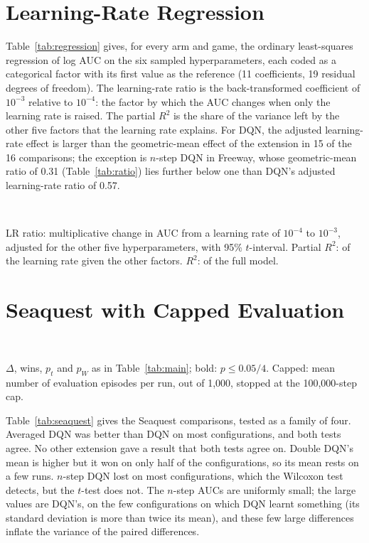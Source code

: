 \documentclass[conference,a4paper]{IEEEtran}
\newcommand{\results}{../analysis_output/corrected-rct-01/report}
\newcommand{\fresults}{../analysis_output/followup-02/report}
\begin{document}
\section{Learning-Rate Regression}\label{app:regression}
Table~\ref{tab:regression} gives, for every arm and game, the ordinary least-squares regression of log AUC on the six
sampled hyperparameters, each coded as a categorical factor with its first value as the reference (11 coefficients,
19 residual degrees of freedom). The learning-rate ratio is the back-transformed coefficient of $10^{-3}$ relative to
$10^{-4}$: the factor by which the AUC changes when only the learning rate is raised. The partial $R^2$ is the share of
the variance left by the other five factors that the learning rate explains. For DQN, the adjusted learning-rate effect
is larger than the geometric-mean effect of the extension in 15 of the 16 comparisons; the exception is $n$-step DQN in
Freeway, whose geometric-mean ratio of 0.31 (Table~\ref{tab:ratio}) lies further below one than DQN's adjusted
learning-rate ratio of 0.57.

\begin{table}[h]
\caption{Adjusted Learning-Rate Effect on Log AUC}
\label{tab:regression}
\centering
\footnotesize
\\[3pt]
\parbox{\columnwidth}{\scriptsize LR ratio: multiplicative change in AUC from a learning rate of $10^{-4}$ to
$10^{-3}$, adjusted for the other five hyperparameters, with 95\% $t$-interval. Partial $R^2$: of the learning rate
given the other factors. $R^2$: of the full model.}
\end{table}

\section{Seaquest with Capped Evaluation}\label{app:seaquest}

\begin{table}[h]
\caption{Seaquest with Capped Evaluation (AUC, $10^{6}$, $n=30$ per Arm)}
\label{tab:seaquest}
\centering
\footnotesize
\setlength{\tabcolsep}{2.5pt}
\\[3pt]
\parbox{\columnwidth}{\scriptsize $\Delta$, wins, $p_t$ and $p_W$ as in Table~\ref{tab:main}; bold: $p\le0.05/4$.
Capped: mean number of evaluation episodes per run, out of 1,000, stopped at the 100,000-step cap.}
\end{table}

Table~\ref{tab:seaquest} gives the Seaquest comparisons, tested as a family of four. Averaged DQN was better than DQN
on most configurations, and both tests agree. No other extension gave a result that both tests agree on. Double DQN's
mean is higher but it won on only half of the configurations, so its mean rests on a few runs. $n$-step DQN lost on
most configurations, which the Wilcoxon test detects, but the $t$-test does not. The $n$-step AUCs are uniformly small;
the large values are DQN's, on the few configurations on which DQN learnt something (its standard deviation is more
than twice its mean), and these few large differences inflate the variance of the paired differences.
\end{document}

